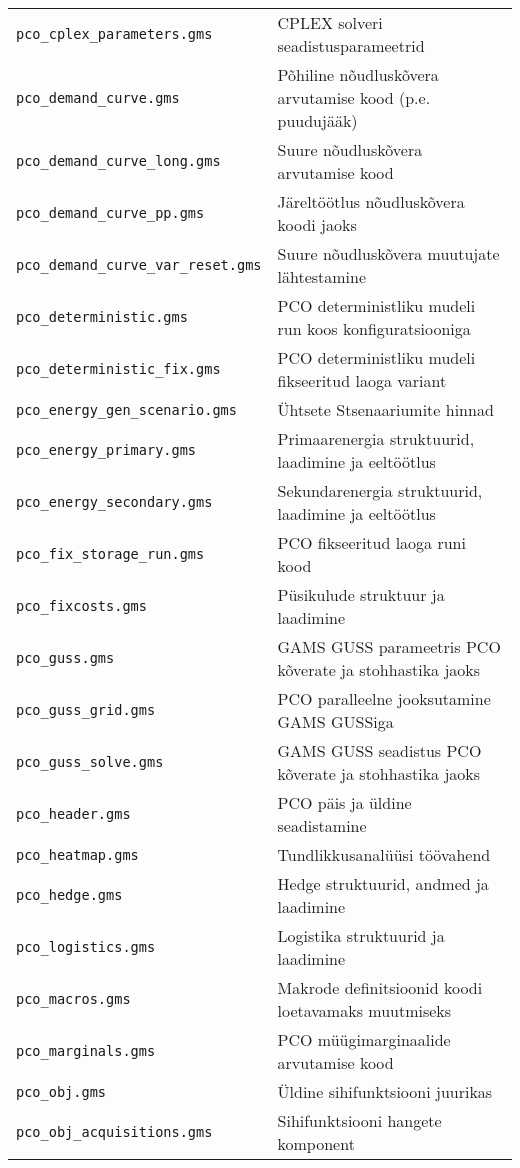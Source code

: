 \begin{longtable}{l l}
\texttt{pco\_cplex\_parameters.gms} & CPLEX solveri seadistusparameetrid\\
\texttt{pco\_demand\_curve.gms} & Põhiline nõudluskõvera arvutamise kood (p.e. puudujääk)\\
\texttt{pco\_demand\_curve\_long.gms} & Suure nõudluskõvera arvutamise kood\\
\texttt{pco\_demand\_curve\_pp.gms} & Järeltöötlus nõudluskõvera koodi jaoks\\
\texttt{pco\_demand\_curve\_var\_reset.gms} & Suure nõudluskõvera muutujate lähtestamine\\
\texttt{pco\_deterministic.gms} & PCO deterministliku mudeli run koos konfiguratsiooniga\\
\texttt{pco\_deterministic\_fix.gms} & PCO deterministliku mudeli fikseeritud laoga variant\\
\texttt{pco\_energy\_gen\_scenario.gms} & Ühtsete Stsenaariumite hinnad\\
\texttt{pco\_energy\_primary.gms} & Primaarenergia struktuurid, laadimine ja eeltöötlus\\
\texttt{pco\_energy\_secondary.gms} & Sekundarenergia struktuurid, laadimine ja eeltöötlus\\
\texttt{pco\_fix\_storage\_run.gms} & PCO fikseeritud laoga runi kood\\
\texttt{pco\_fixcosts.gms} & Püsikulude struktuur ja laadimine\\
\texttt{pco\_guss.gms} & GAMS GUSS parameetris PCO kõverate ja stohhastika jaoks\\
\texttt{pco\_guss\_grid.gms} & PCO paralleelne jooksutamine GAMS GUSSiga\\
\texttt{pco\_guss\_solve.gms} & GAMS GUSS seadistus PCO kõverate ja stohhastika jaoks\\
\texttt{pco\_header.gms} & PCO päis ja üldine seadistamine\\
\texttt{pco\_heatmap.gms} & Tundlikkusanalüüsi töövahend\\
\texttt{pco\_hedge.gms} & Hedge struktuurid, andmed ja laadimine\\
\texttt{pco\_logistics.gms} & Logistika struktuurid ja laadimine\\
\texttt{pco\_macros.gms} & Makrode definitsioonid koodi loetavamaks muutmiseks\\
\texttt{pco\_marginals.gms} & PCO müügimarginaalide arvutamise kood\\
\texttt{pco\_obj.gms} & Üldine sihifunktsiooni juurikas\\
\texttt{pco\_obj\_acquisitions.gms} & Sihifunktsiooni hangete komponent\\

\end{longtable}
